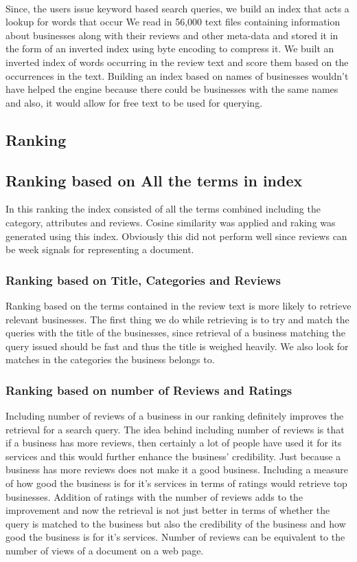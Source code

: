 \documentclass[paper=letter, fontsize=15pt]{article} %
\begin{document}
\paragraph{}Since, the users issue keyword based search queries, we build an index that acts a lookup for words that occur  We read in 56,000 text files containing information about businesses along with their reviews and other meta-data and stored it in the form of an inverted index using byte encoding to compress it. We built an inverted index of words occurring in the review text and score them based on the occurrences in the text. Building an index based on names of businesses wouldn't have helped the engine because there could be businesses with the same names and also, it would allow for free text to be used for querying.

\subsection{Ranking}
\subsection{Ranking based on All the terms in index}
In this ranking the index consisted of all the terms combined including the category, attributes and reviews. Cosine similarity was applied and raking was generated using this index. Obviously this did not perform well since reviews can be week signals for representing a document.
\subsubsection{Ranking based on Title, Categories and Reviews}
Ranking based on the terms contained in the review text is more likely to retrieve relevant businesses. The first thing we do while retrieving is to try and match the queries with the title of the businesses, since retrieval of a business matching the query issued should be fast and thus the title is weighed heavily. We also look for matches in the categories the business belongs to. 
\subsubsection{Ranking based on number of Reviews and Ratings}
Including number of reviews of a business in our ranking definitely improves the retrieval for a search query. The idea behind including number of reviews is that if a business has more reviews, then certainly a lot of people have used it for its services and this would further enhance the business' credibility. Just because a business has more reviews does not make it a good business. Including a measure of how good the business is for it's services in terms of ratings would retrieve top businesses. Addition of ratings with the number of reviews adds to the improvement and now the retrieval is not just better in terms of whether the query is matched to the business but also the credibility of the business and how good the business is for it's services. Number of reviews can be equivalent to the number of views of a document on a web page.
\end{document}
